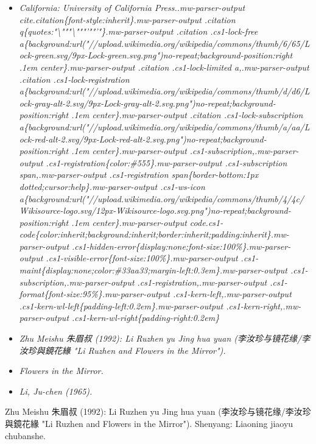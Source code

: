 \begin{itemize}
\item
  \emph{California: University of California Press..mw-parser-output
  cite.citation\{font-style:inherit\}.mw-parser-output .citation
  q\{quotes:"\textbackslash{}"""\textbackslash{}"""'""'"\}.mw-parser-output
  .citation .cs1-lock-free
  a\{background:url("//upload.wikimedia.org/wikipedia/commons/thumb/6/65/Lock-green.svg/9px-Lock-green.svg.png")no-repeat;background-position:right
  .1em center\}.mw-parser-output .citation .cs1-lock-limited
  a,.mw-parser-output .citation .cs1-lock-registration
  a\{background:url("//upload.wikimedia.org/wikipedia/commons/thumb/d/d6/Lock-gray-alt-2.svg/9px-Lock-gray-alt-2.svg.png")no-repeat;background-position:right
  .1em center\}.mw-parser-output .citation .cs1-lock-subscription
  a\{background:url("//upload.wikimedia.org/wikipedia/commons/thumb/a/aa/Lock-red-alt-2.svg/9px-Lock-red-alt-2.svg.png")no-repeat;background-position:right
  .1em center\}.mw-parser-output .cs1-subscription,.mw-parser-output
  .cs1-registration\{color:\#555\}.mw-parser-output .cs1-subscription
  span,.mw-parser-output .cs1-registration span\{border-bottom:1px
  dotted;cursor:help\}.mw-parser-output .cs1-ws-icon
  a\{background:url("//upload.wikimedia.org/wikipedia/commons/thumb/4/4c/Wikisource-logo.svg/12px-Wikisource-logo.svg.png")no-repeat;background-position:right
  .1em center\}.mw-parser-output
  code.cs1-code\{color:inherit;background:inherit;border:inherit;padding:inherit\}.mw-parser-output
  .cs1-hidden-error\{display:none;font-size:100\%\}.mw-parser-output
  .cs1-visible-error\{font-size:100\%\}.mw-parser-output
  .cs1-maint\{display:none;color:\#33aa33;margin-left:0.3em\}.mw-parser-output
  .cs1-subscription,.mw-parser-output
  .cs1-registration,.mw-parser-output
  .cs1-format\{font-size:95\%\}.mw-parser-output
  .cs1-kern-left,.mw-parser-output
  .cs1-kern-wl-left\{padding-left:0.2em\}.mw-parser-output
  .cs1-kern-right,.mw-parser-output
  .cs1-kern-wl-right\{padding-right:0.2em\}}
\item
  \emph{Zhu Meishu 朱眉叔 (1992): Li Ruzhen yu Jing hua yuan
  (李汝珍与镜花缘/李汝珍與鏡花緣 "Li Ruzhen and Flowers in the
  Mirror").}
\item
  \emph{Flowers in the Mirror.}
\item
  \emph{Li, Ju-chen (1965).}
\end{itemize}

Zhu Meishu 朱眉叔 (1992): Li Ruzhen yu Jing hua yuan
(李汝珍与镜花缘/李汝珍與鏡花緣 "Li Ruzhen and Flowers in the Mirror").
Shenyang: Liaoning jiaoyu chubanshe.

